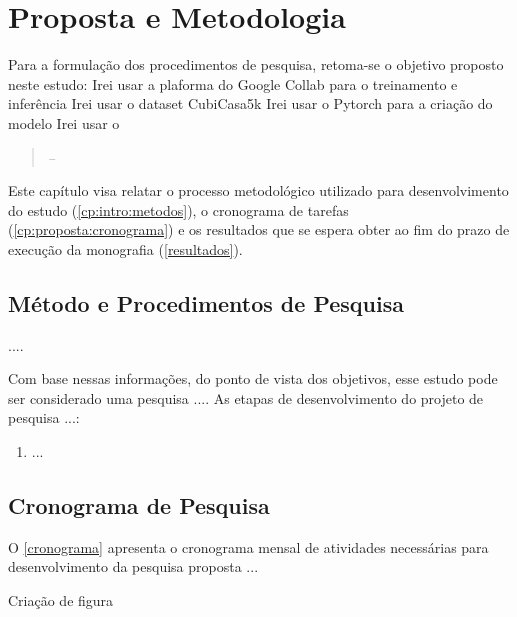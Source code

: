 \chapter{Proposta e Metodologia}\label{cp:metodologia}
Para a formulação dos procedimentos de pesquisa, retoma-se o objetivo proposto neste estudo:
Irei usar a plaforma do Google Collab para o treinamento e inferência
Irei usar o dataset CubiCasa5k
Irei usar o Pytorch para a criação do modelo
Irei usar o 
\begin{quotation}
\textit{ --  }
\end{quotation}

Este capítulo visa relatar o processo metodológico utilizado para desenvolvimento do estudo (\autoref{cp:intro:metodos}), o cronograma de tarefas (\autoref{cp:proposta:cronograma}) e os resultados que se espera obter ao fim do prazo de execução da monografia (\autoref{resultados}).

\section{Método e Procedimentos de Pesquisa}\label{cp:intro:metodos}
 ....

Com base nessas informações, do ponto de vista dos objetivos, esse estudo pode ser considerado uma pesquisa .... As etapas de desenvolvimento do projeto de pesquisa ...:

\begin{enumerate} 
\item ...

\end{enumerate}

\section{Cronograma de Pesquisa}\label{cp:proposta:cronograma}
O \autoref{cronograma} apresenta o cronograma mensal de atividades necessárias para desenvolvimento da pesquisa proposta ...

Criação de figura 

